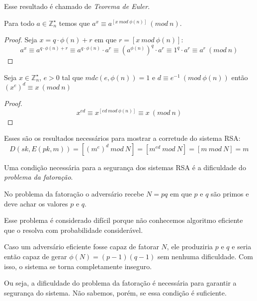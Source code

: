 Esse resultado é chamado de {\em Teorema de Euler}.

\begin{corollary}
  Para todo $a \in \mathbb{Z}_n^\star$ temos que $a^x \equiv a^{[x\ mod\ \phi(n)]}\ (mod\ n)$.
\end{corollary}
\begin{proof}
  Seja $x = q \cdot \phi(n) + r$ em que $r = [x\ mod\ \phi(n)]$:
  \begin{displaymath}
    a^x \equiv a^{q \cdot \phi(n) + r} \equiv a^{q \cdot \phi(n)} \cdot a^r \equiv (a^{\phi(n)})^q \cdot a^r \equiv 1^q \cdot a^r \equiv a^r\ (mod\ n)
  \end{displaymath}
\end{proof}


\begin{corollary}
\label{cor:euler}
Seja $x \in \mathbb{Z}_n^\star$, $e > 0$ tal que $mdc(e, \phi(n)) = 1$ e $d \equiv e^{-1}\ (mod\ \phi(n))$ então $(x^e)^d \equiv x\ (mod\ n)$
\end{corollary}

\begin{proof}
  \begin{displaymath}
    x^{ed} \equiv x^{[ed\ mod\ \phi(n)]} \equiv x\ (mod\ n)
  \end{displaymath}
\end{proof}

Esses são os resultados necessários para mostrar a corretude do sistema RSA:
\begin{displaymath}
D(sk, E(pk, m)) = [(m^e)^d\ mod\ N] = [m^{ed}\ mod\ N] = [m\ mod\ N] = m
\end{displaymath}

Uma condição necessária para a segurança dos sistemas RSA é a dificuldade do {\em problema da fatoração}.

No problema da fatoração o adversário recebe $N = pq$ em que $p$ e $q$ são primos e deve achar os valores $p$ e $q$.

Esse problema é considerado difícil porque não conhecemos algoritmo eficiente que o resolva com probabilidade considerável.

Caso um adversário eficiente fosse capaz de fatorar $N$, ele produziria $p$ e $q$ e seria então capaz de gerar $\phi(N) = (p-1)(q-1)$ sem nenhuma dificuldade.
Com isso, o sistema se torna completamente inseguro.

Ou seja, a dificuldade do problema da fatoração é necessária para garantir a segurança do sistema. 
Não sabemos, porém, se essa condição é suficiente.

